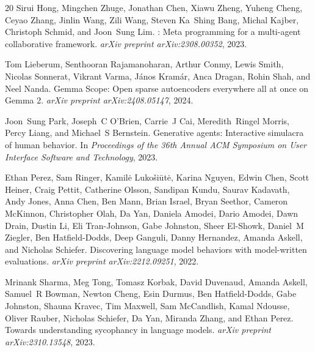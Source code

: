 \documentclass[10pt,twocolumn]{article}
\begin{document}
\begin{thebibliography}{20}
Sirui Hong, Mingchen Zhuge, Jonathan Chen, Xiawu Zheng, Yuheng Cheng, Ceyao Zhang, Jinlin Wang, Zili Wang, Steven Ka~Shing Bang, Michal Kajber, Christoph Schmid, and Joon~Sung Lim.
: Meta programming for a multi-agent collaborative framework.
\newblock \emph{arXiv preprint arXiv:2308.00352}, 2023.

Tom Lieberum, Senthooran Rajamanoharan, Arthur Conmy, Lewis Smith, Nicolas Sonnerat, Vikrant Varma, J{\'a}nos Kram{\'a}r, Anca Dragan, Rohin Shah, and Neel Nanda.
\newblock Gemma {S}cope: Open sparse autoencoders everywhere all at once on {G}emma 2.
\newblock \emph{arXiv preprint arXiv:2408.05147}, 2024.

Joon~Sung Park, Joseph~C O'Brien, Carrie~J Cai, Meredith~Ringel Morris, Percy Liang, and Michael~S Bernstein.
\newblock Generative agents: Interactive simulacra of human behavior.
\newblock In \emph{Proceedings of the 36th Annual ACM Symposium on User Interface Software and Technology}, 2023.

Ethan Perez, Sam Ringer, Kamil{\.e} Luko{\v{s}}i{\=u}t{\.e}, Karina Nguyen, Edwin Chen, Scott Heiner, Craig Pettit, Catherine Olsson, Sandipan Kundu, Saurav Kadavath, Andy Jones, Anna Chen, Ben Mann, Brian Israel, Bryan Seethor, Cameron McKinnon, Christopher Olah, Da Yan, Daniela Amodei, Dario Amodei, Dawn Drain, Dustin Li, Eli Tran-Johnson, Gabe Johnston, Sheer El-Showk, Daniel~M Ziegler, Ben Hatfield-Dodds, Deep Ganguli, Danny Hernandez, Amanda Askell, and Nicholas Schiefer.
\newblock Discovering language model behaviors with model-written evaluations.
\newblock \emph{arXiv preprint arXiv:2212.09251}, 2022.

Mrinank Sharma, Meg Tong, Tomasz Korbak, David Duvenaud, Amanda Askell, Samuel~R Bowman, Newton Cheng, Esin Durmus, Ben Hatfield-Dodds, Gabe Johnston, Shauna Kravec, Tim Maxwell, Sam McCandlish, Kamal Ndousse, Oliver Rauber, Nicholas Schiefer, Da Yan, Miranda Zhang, and Ethan Perez.
\newblock Towards understanding sycophancy in language models.
\newblock \emph{arXiv preprint arXiv:2310.13548}, 2023.


\end{thebibliography}
\end{document}
